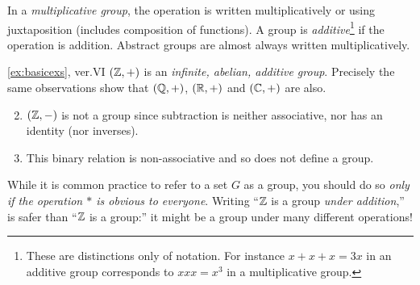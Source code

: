 In a \emph{multiplicative group}, the operation is written multiplicatively or using juxtaposition (includes composition of functions). A group is \emph{additive}\footnote{\label{fn:additive}%
	These are distinctions only of notation. For instance $x+x+x=3x$ in an additive group corresponds to $xxx=x^3$ in a multiplicative group.%
} if the operation is addition. Abstract groups are almost always written multiplicatively.

\begin{examples*}{\ref{ex:basicexs}, ver.VI}{}
	\exstart $(\mathbb{Z},+)$ is an \emph{infinite, abelian, additive group}. Precisely the same observations show that $(\mathbb{Q},+)$, $(\mathbb{R},+)$ and $(\mathbb{C},+)$ are also.
	\begin{enumerate}\setcounter{enumi}{1}
	  \item $(\mathbb{Z},-)$ is not a group since subtraction is neither associative, nor has an identity (nor inverses).
	  \item This binary relation is non-associative and so does not define a group.
	\end{enumerate}
\end{examples*}

While it is common practice to refer to a set $G$ as a group, you should do so \emph{only if the operation $\ast$ is obvious to everyone}. Writing ``$\mathbb{Z}$ is a group \emph{under addition},'' is safer than ``$\mathbb{Z}$ is a group:'' it might be a group under many different operations!

